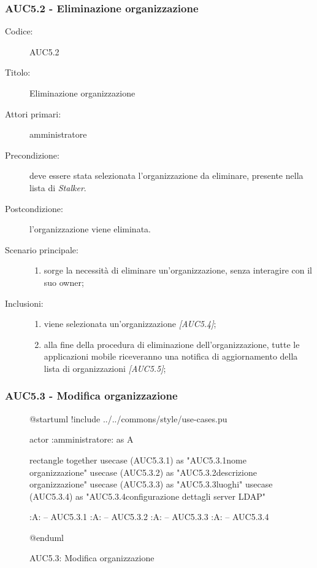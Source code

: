 \documentclass[../../../analisi-dei-requisiti.tex]{subfiles}
\begin{document}
\subsubsection{AUC5.2 - Eliminazione organizzazione}%
\label{subs:AUC5.2}
\begin{description}
  \item[Codice:] AUC5.2
  \item[Titolo:] Eliminazione organizzazione
  \item[Attori primari:] amministratore
  \item[Precondizione:] deve essere stata selezionata l'organizzazione da eliminare, presente nella lista di \emph{Stalker}.
  \item[Postcondizione:] l'organizzazione viene eliminata.
  \item[Scenario principale:]
  \begin{enumerate}
    \item sorge la necessità di eliminare un'organizzazione, senza interagire con il suo owner;
  \end{enumerate}
  \item[Inclusioni:]
  \begin{enumerate}
    \item viene selezionata un'organizzazione \emph{[AUC5.4]};
    \item alla fine della procedura di eliminazione dell'organizzazione, tutte le applicazioni mobile riceveranno una notifica di aggiornamento della lista di organizzazioni \emph{[AUC5.5]};
  \end{enumerate}
\end{description}

\subsubsection{AUC5.3 - Modifica organizzazione}%
\label{subs:AUC5.3}

\begin{figure}[h!]
  \centering
  \begin{plantuml}
  @startuml
  !include ../../commons/style/use-cases.pu

  actor :amministratore: as A

  rectangle {
    together {
      usecase (AUC5.3.1) as "AUC5.3.1\nModifica nome organizzazione"
      usecase (AUC5.3.2) as "AUC5.3.2\nModifica descrizione organizzazione"
      usecase (AUC5.3.3) as "AUC5.3.3\nGestione luoghi"
      usecase (AUC5.3.4) as "AUC5.3.4\nModifica configurazione dettagli server LDAP"
    }
  }

  :A: -- AUC5.3.1
  :A: -- AUC5.3.2
  :A: -- AUC5.3.3
  :A: -- AUC5.3.4

  @enduml
  \end{plantuml}
  \caption{AUC5.3: Modifica organizzazione}
  \label{fig:AUC5_3}
\end{figure}
\end{document}
